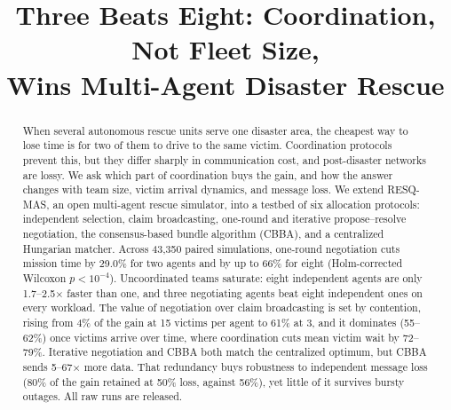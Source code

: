 \documentclass[conference]{IEEEtran}
\begin{document}
\title{Three Beats Eight: Coordination, Not Fleet Size,\\ Wins Multi-Agent Disaster Rescue}

\author{
}

\maketitle

\begin{abstract}
When several autonomous rescue units serve one disaster area, the cheapest way to lose time is for two of them to drive to the same victim. Coordination protocols prevent this, but they differ sharply in communication cost, and post-disaster networks are lossy. We ask which part of coordination buys the gain, and how the answer changes with team size, victim arrival dynamics, and message loss. We extend RESQ-MAS, an open multi-agent rescue simulator, into a testbed of six allocation protocols: independent selection, claim broadcasting, one-round and iterative propose--resolve negotiation, the consensus-based bundle algorithm (CBBA), and a centralized Hungarian matcher. Across 43,350 paired simulations, one-round negotiation cuts mission time by 29.0\% for two agents and by up to 66\% for eight (Holm-corrected Wilcoxon $p<10^{-4}$). Uncoordinated teams saturate: eight independent agents are only 1.7--2.5$\times$ faster than one, and three negotiating agents beat eight independent ones on every workload. The value of negotiation over claim broadcasting is set by contention, rising from 4\% of the gain at 15 victims per agent to 61\% at 3, and it dominates (55--62\%) once victims arrive over time, where coordination cuts mean victim wait by 72--79\%. Iterative negotiation and CBBA both match the centralized optimum, but CBBA sends 5--67$\times$ more data. That redundancy buys robustness to independent message loss (80\% of the gain retained at 50\% loss, against 56\%), yet little of it survives bursty outages. All raw runs are released.
\end{abstract}
\end{document}
